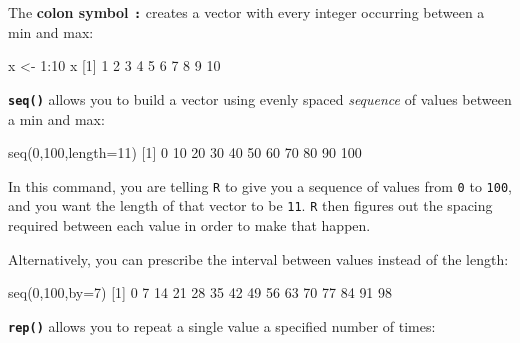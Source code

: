\documentclass[
]{book}
\newenvironment{Shaded}{\begin{snugshade}}{\end{snugshade}}
\newcommand{\AttributeTok}[1]{\textcolor[rgb]{0.77,0.63,0.00}{#1}}
\newcommand{\DecValTok}[1]{\textcolor[rgb]{0.00,0.00,0.81}{#1}}
\newcommand{\FunctionTok}[1]{\textcolor[rgb]{0.00,0.00,0.00}{#1}}
\newcommand{\NormalTok}[1]{#1}
\newcommand{\OtherTok}[1]{\textcolor[rgb]{0.56,0.35,0.01}{#1}}
\newcommand{\SpecialCharTok}[1]{\textcolor[rgb]{0.00,0.00,0.00}{#1}}
\begin{document}
The \textbf{colon symbol \texttt{:}} creates a vector with every integer occurring between a min and max:

\begin{Shaded}
\begin{Highlighting}[]
\NormalTok{x }\OtherTok{\textless{}{-}} \DecValTok{1}\SpecialCharTok{:}\DecValTok{10}
\NormalTok{x}
\NormalTok{ [}\DecValTok{1}\NormalTok{]  }\DecValTok{1}  \DecValTok{2}  \DecValTok{3}  \DecValTok{4}  \DecValTok{5}  \DecValTok{6}  \DecValTok{7}  \DecValTok{8}  \DecValTok{9} \DecValTok{10}
\end{Highlighting}
\end{Shaded}

\textbf{\texttt{seq()}} allows you to build a vector using evenly spaced \emph{sequence} of values between a min and max:

\begin{Shaded}
\begin{Highlighting}[]
\FunctionTok{seq}\NormalTok{(}\DecValTok{0}\NormalTok{,}\DecValTok{100}\NormalTok{,}\AttributeTok{length=}\DecValTok{11}\NormalTok{)}
\NormalTok{ [}\DecValTok{1}\NormalTok{]   }\DecValTok{0}  \DecValTok{10}  \DecValTok{20}  \DecValTok{30}  \DecValTok{40}  \DecValTok{50}  \DecValTok{60}  \DecValTok{70}  \DecValTok{80}  \DecValTok{90} \DecValTok{100}
\end{Highlighting}
\end{Shaded}

In this command, you are telling \texttt{R} to give you a sequence of values from \texttt{0} to \texttt{100}, and you want the length of that vector to be \texttt{11}. \texttt{R} then figures out the spacing required between each value in order to make that happen.

Alternatively, you can prescribe the interval between values instead of the length:

\begin{Shaded}
\begin{Highlighting}[]
\FunctionTok{seq}\NormalTok{(}\DecValTok{0}\NormalTok{,}\DecValTok{100}\NormalTok{,}\AttributeTok{by=}\DecValTok{7}\NormalTok{)}
\NormalTok{ [}\DecValTok{1}\NormalTok{]  }\DecValTok{0}  \DecValTok{7} \DecValTok{14} \DecValTok{21} \DecValTok{28} \DecValTok{35} \DecValTok{42} \DecValTok{49} \DecValTok{56} \DecValTok{63} \DecValTok{70} \DecValTok{77} \DecValTok{84} \DecValTok{91} \DecValTok{98}
\end{Highlighting}
\end{Shaded}

\textbf{\texttt{rep()}} allows you to repeat a single value a specified number of times:
\end{document}
